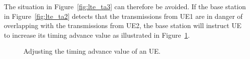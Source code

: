 The situation in Figure~\ref{fig:lte_ta3} can therefore be avoided. If the base station in Figure~\ref{fig:lte_ta2} detects that the transmissions from UE1 are in danger of overlapping with the transmissions from UE2, the base station will instruct UE to increase its timing advance value as illustrated in Figure~\ref{fig:lte_ta4}.
\begin{figure}[htbp]
	\centering
	\caption{\label{fig:lte_ta4}Adjusting the timing advance value of an UE.}
\end{figure}
 